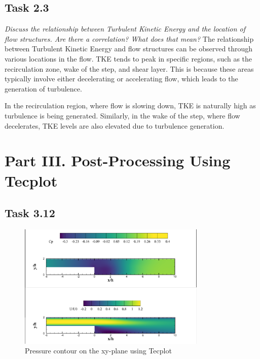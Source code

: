 \subsection{Task 2.3}
\textit{Discuss the relationship between Turbulent Kinetic Energy and the location of flow structures. Are there a correlation? What does that mean?}
The relationship between Turbulent Kinetic Energy and flow structures can be observed through various locations in the flow. TKE tends to peak in specific regions, such as the recirculation zone, wake of the step, and shear layer. This is because these areas typically involve either decelerating or accelerating flow, which leads to the generation of turbulence.

In the recirculation region, where flow is slowing down, TKE is naturally high as turbulence is being generated. Similarly, in the wake of the step, where flow decelerates, TKE levels are also elevated due to turbulence generation.

\section{Part III. Post-Processing Using Tecplot}
\subsection{Task 3.12}
\begin{figure}[H]
    \centering
    \includegraphics[width=0.8\textwidth]{Questions/Figures/tecplot.png}
    \caption{Pressure contour on the xy-plane using Tecplot}
\end{figure}